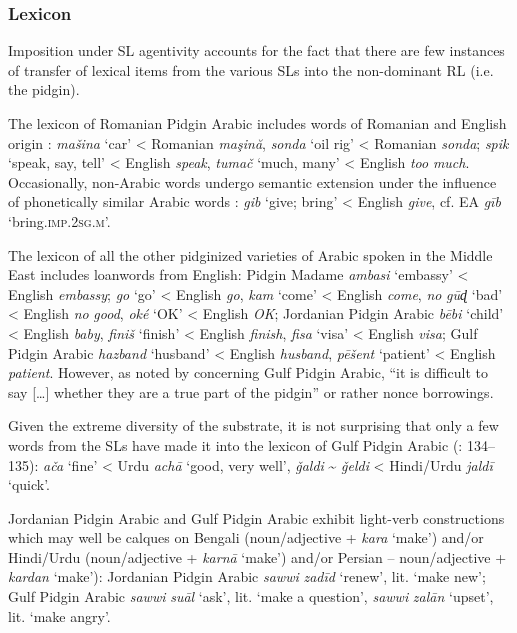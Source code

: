 \documentclass[output=paper]{langsci/langscibook}
\begin{document}
 \subsubsection{Lexicon}

Imposition under SL agentivity accounts for the fact that there are few instances of transfer of lexical items from the various SLs into the non-dominant RL (i.e. the pidgin). 

The lexicon of Romanian Pidgin Arabic includes words of Romanian and English origin \citep[32]{Avram2010}: \textit{mašina} ‘car’ < Romanian \textit{maşină}, \textit{sonda} ‘oil rig’ < Romanian \textit{sonda}; \textit{spik} ‘speak, say, tell’ < English \textit{speak}, \textit{tumač} ‘much, many’ < English \textit{too} \textit{much}. Occasionally, non-Arabic words undergo semantic extension under the influence of phonetically similar Arabic words \citep[32]{Avram2010}: \textit{gib} ‘give; bring’ < English \textit{give}, cf. EA \textit{gīb} ‘bring.\textsc{imp.2sg.m}’. 

  The lexicon of all the other pidginized varieties of Arabic spoken in the Middle East includes loanwords from English: Pidgin Madame \textit{ambasi} `embassy' < English \textit{embassy}; \textit{go} `go' < English \textit{go}, \textit{kam} `come' < English \textit{come}, \textit{no} \textit{gūɖ} ‘bad’ < English \textit{no} \textit{good}, \textit{oké} `OK' < English \textit{OK}; Jordanian Pidgin Arabic \textit{bēbi} ‘child’ < English \textit{baby}, \textit{finiš} ‘finish’ < English \textit{finish}, \textit{fisa} ‘visa’ < English \textit{visa}; Gulf Pidgin Arabic \textit{hazband} `husband' < English \textit{husband}, \textit{pēšent} ‘patient’ < English \textit{patient}. However, as noted by \citet[113]{Smart1990} concerning Gulf Pidgin Arabic, “it is difficult to say […] whether they are a true part of the pidgin” or rather nonce borrowings.  

Given the extreme diversity of the substrate, it is not surprising that only a few words from the SLs have made it into the lexicon of Gulf Pidgin Arabic (\citealt{Avram2017article}: 134–135): \textit{ača} ‘fine’ < Urdu \textit{achā} ‘good, very well’, \textit{ǧaldi} {\textasciitilde}  \textit{ǧeldi} < Hindi/Urdu \textit{jaldī} ‘quick’. 

Jordanian Pidgin Arabic and Gulf Pidgin Arabic exhibit light-verb constructions which may well be calques on Bengali (noun/adjective + \textit{kara} ‘make’) and/or Hindi/Urdu (noun/adjective + \textit{karnā} ‘make’) and/or Persian – noun/adjective + \textit{kardan} ‘make’): Jordanian Pidgin Arabic \textit{sawwi} \textit{zadīd} ‘renew’, lit. ‘make new’; Gulf Pidgin Arabic \textit{sawwi} \textit{suāl} ‘ask’, lit. ‘make a question’, \textit{sawwi} \textit{zalān} ‘upset’, lit. ‘make angry’. 
\end{document}
